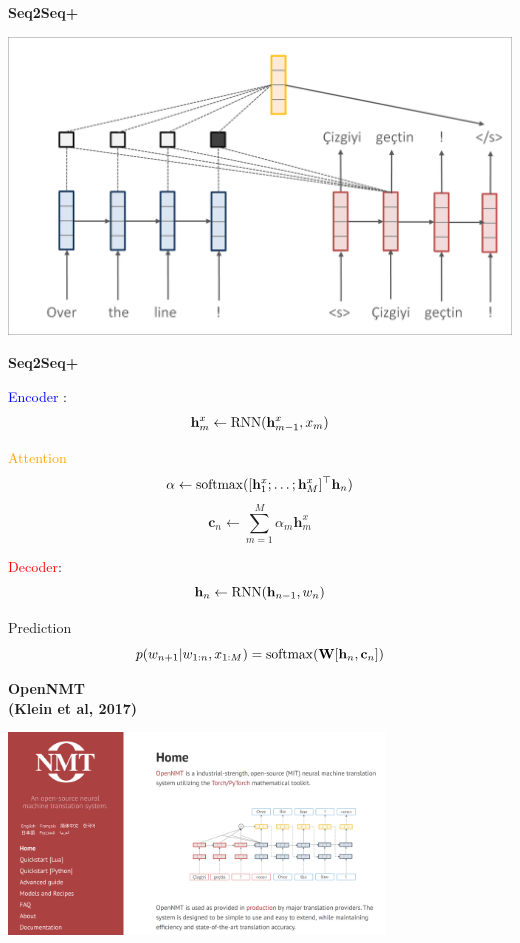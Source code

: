 \documentclass[aspectratio=169]{beamer}
\newcommand{\air}{\vspace{0.25cm}}
\begin{document}
\begin{frame}
  \begin{center}
    \textbf{Seq2Seq+} \air

  \end{center}
\center
\vspace{-5mm}
 \air
\includegraphics[scale=0.37]{nmt-attn10}
\end{frame}

\begin{frame}
  \centerline{\textbf{Seq2Seq+}}

  \textcolor{blue}{Encoder} :
  \[{\mathbf{h}^{x}_m \gets \operatorname*{RNN}(\mathbf{h}^{x}_{m-1}, x_m)} \]


  \textcolor{orange}{Attention}
  \[\alpha \gets  \operatorname*{softmax}(   [\mathbf{h}^{x}_1 ; \ldots; \mathbf{h}^{x}_M]^\top \mathbf{h}_{n} )\]
  \[{\mathbf{c}_n} \gets \sum_{m =1}^M \alpha_m \mathbf{h}_m^{x}  \]

  \textcolor{red}{Decoder}:
  \[{\mathbf{h}_n \gets \operatorname*{RNN}(\mathbf{h}_{n-1}, w_n)} \]

  Prediction
  \[p(w_{n+1} | w_{1:n}, x_{1:M}) = \operatorname*{softmax}( \mathbf{W} [\mathbf{h}_n, \mathbf{c}_n]) \]

\end{frame}


\begin{frame}
  \begin{center}
    \textbf{OpenNMT\\ {\small (Klein et al, 2017)}}

  \includegraphics[width=10cm]{opennmt}
  \end{center}

\end{frame}
\end{document}
